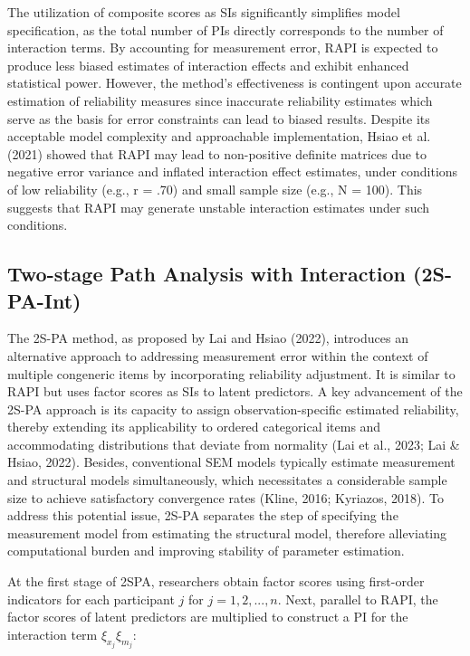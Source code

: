 \documentclass[
  man]{apa6}
\begin{document}
The utilization of composite scores as SIs significantly simplifies model specification, as the total number of PIs directly corresponds to the number of interaction terms. By accounting for measurement error, RAPI is expected to produce less biased estimates of interaction effects and exhibit enhanced statistical power. However, the method's effectiveness is contingent upon accurate estimation of reliability measures since inaccurate reliability estimates which serve as the basis for error constraints can lead to biased results. Despite its acceptable model complexity and approachable implementation, Hsiao et al. (2021) showed that RAPI may lead to non-positive definite matrices due to negative error variance and inflated interaction effect estimates, under conditions of low reliability (e.g., r = .70) and small sample size (e.g., N = 100). This suggests that RAPI may generate unstable interaction estimates under such conditions.

\subsection{Two-stage Path Analysis with Interaction (2S-PA-Int)}\label{two-stage-path-analysis-with-interaction-2s-pa-int}

The 2S-PA method, as proposed by Lai and Hsiao (2022), introduces an alternative approach to addressing measurement error within the context of multiple congeneric items by incorporating reliability adjustment. It is similar to RAPI but uses factor scores as SIs to latent predictors. A key advancement of the 2S-PA approach is its capacity to assign observation-specific estimated reliability, thereby extending its applicability to ordered categorical items and accommodating distributions that deviate from normality (Lai et al., 2023; Lai \& Hsiao, 2022). Besides, conventional SEM models typically estimate measurement and structural models simultaneously, which necessitates a considerable sample size to achieve satisfactory convergence rates (Kline, 2016; Kyriazos, 2018). To address this potential issue, 2S-PA separates the step of specifying the measurement model from estimating the structural model, therefore alleviating computational burden and improving stability of parameter estimation.

At the first stage of 2SPA, researchers obtain factor scores using first-order indicators for each participant \(j\) for \(j = 1, 2, ..., n\). Next, parallel to RAPI, the factor scores of latent predictors are multiplied to construct a PI for the interaction term \(\xi_{x_{j}}\xi_{m_{j}}\):
\end{document}
